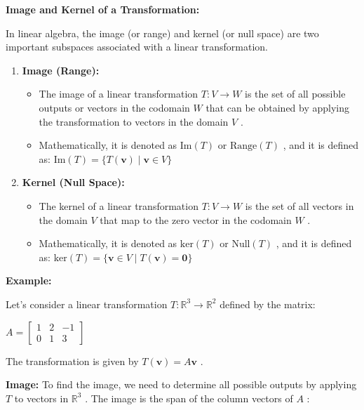 \documentclass[11pt]{article}
\providecommand{\tightlist}{%
      \setlength{\itemsep}{0pt}\setlength{\parskip}{0pt}}
\begin{document}
    \textbf{Image and Kernel of a Transformation:}

In linear algebra, the image (or range) and kernel (or null space) are
two important subspaces associated with a linear transformation.

\begin{enumerate}
\def\labelenumi{\arabic{enumi}.}
\tightlist
\item
  \textbf{Image (Range):}

  \begin{itemize}
  \tightlist
  \item
    The image of a linear transformation $  T: V \rightarrow W$  is the
    set of all possible outputs or vectors in the codomain $  W$  that
    can be obtained by applying the transformation to vectors in the
    domain $  V$  .
  \item
    Mathematically, it is denoted as $  \text{Im}(T) $  or $ 
    \text{Range}(T) $  , and it is defined as: $  \text{Im}(T) = \{
    T(\mathbf{v}) \mid \mathbf{v} \in V \} $ 
  \end{itemize}
\item
  \textbf{Kernel (Null Space):}

  \begin{itemize}
  \tightlist
  \item
    The kernel of a linear transformation $  T: V \rightarrow W$  is the
    set of all vectors in the domain $  V$  that map to the zero vector
    in the codomain $  W$  .
  \item
    Mathematically, it is denoted as $  \text{ker}(T) $  or $ 
    \text{Null}(T) $  , and it is defined as: $  \text{ker}(T) = \{
    \mathbf{v} \in V \mid T(\mathbf{v}) = \mathbf{0} \} $ 
  \end{itemize}
\end{enumerate}

\textbf{Example:}

Let's consider a linear transformation $  T: \mathbb{R}^3
\rightarrow \mathbb{R}^2$  defined by the matrix:

$  A =\begin{bmatrix} 1 & 2 & -1 \\ 0 & 1 & 3 \end{bmatrix}$ 

The transformation is given by $  T(\mathbf{v}) = A\mathbf{v}$  .

\textbf{Image:} To find the image, we need to determine all possible
outputs by applying $  T$  to vectors in $  \mathbb{R}^3$  . The
image is the span of the column vectors of $  A$  :
\end{document}
